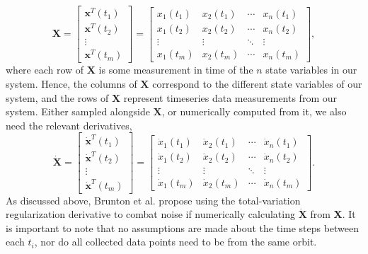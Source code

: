 \documentclass[10pt]{paper}
\begin{document}
\[ \mathbf X = \begin{bmatrix}
	\mathbf x^T(t_1) \\ \mathbf x^T(t_2) \\ \vdots \\ \mathbf x^T(t_m)
\end{bmatrix} = \begin{bmatrix}
	x_1(t_1) & x_2(t_1) & \cdots & x_n(t_1) \\
	x_1(t_2) & x_2(t_2) & \cdots & x_n(t_2) \\
	\vdots & \vdots & \ddots & \vdots \\ 
	x_1(t_m) & x_2(t_m) & \cdots & x_n(t_m)
\end{bmatrix}, \]  
where each row of $\mathbf X$ is some measurement in time of the $n$ state variables in our system. Hence, the columns of $\mathbf X$ correspond to the different state variables of our system, and the rows of $\mathbf X$ represent timeseries data measurements from our system. Either sampled alongside $\mathbf X$, or numerically computed from it, we also need the relevant derivatives, 
\[ \mathbf {\dot X} = \begin{bmatrix}
	\mathbf {\dot x}^T(t_1) \\ \mathbf {\dot x}^T(t_2) \\ \vdots \\ \mathbf {\dot x}^T(t_m)
\end{bmatrix} = \begin{bmatrix}
	\dot x_1(t_1) & \dot x_2(t_1) & \cdots & \dot x_n(t_1) \\
	\dot x_1(t_2) & \dot x_2(t_2) & \cdots & \dot x_n(t_2) \\
	\vdots & \vdots & \ddots & \vdots \\ 
	\dot x_1(t_m) & \dot x_2(t_m) & \cdots & \dot x_n(t_m)
\end{bmatrix}. \]  
As discussed above, Brunton et al. propose using the total-variation regularization derivative to combat noise if numerically calculating $\mathbf {\dot X}$ from $\mathbf X$. 
It is important to note that no assumptions are made about the time steps between each $t_i$, nor do all collected data points need to be from the same orbit. 
\end{document}
